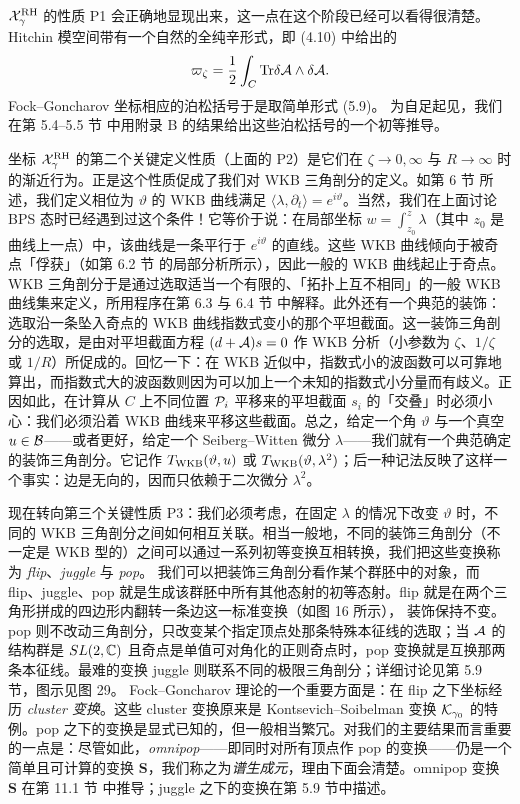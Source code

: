$\mathcal{X}^{\rm RH}_\gamma$ 的性质 P1 会正确地显现出来，这一点在这个阶段已经可以看得很清楚。Hitchin 模空间带有一个自然的全纯辛形式，即 (4.10) 中给出的%
\begin{equation}
\varpi_\zeta = \frac{1}{2}\int_{C} {\operatorname{Tr}} \delta \mathcal{A} \wedge \delta \mathcal{A}. \label{eq:symplectic}
\end{equation}
Fock–Goncharov 坐标相应的泊松括号于是取简单形式 (5.9)。%
为自足起见，我们在第 5.4–5.5 节%
中用附录 B%
的结果给出这些泊松括号的一个初等推导。

坐标 $\mathcal{X}^{\rm RH}_{\gamma}$ 的第二个关键定义性质（上面的 P2）是它们在 $\zeta \to 0,\infty$ 与 $R \to \infty$ 时的渐近行为。正是这个性质促成了我们对 WKB 三角剖分的定义。如第 6 节%
所述，我们定义相位为 $\vartheta$ 的 WKB 曲线满足 $\langle \lambda, \partial_t \rangle = e^{i \vartheta}$。当然，我们在上面讨论 BPS 态时已经遇到过这个条件！它等价于说：在局部坐标 $w = \int^z_{z_0} \lambda$（其中 $z_0$ 是曲线上一点）中，该曲线是一条平行于 $e^{i \vartheta}$ 的直线。这些 WKB 曲线倾向于被奇点「俘获」（如第 6.2 节%
的局部分析所示），因此一般的 WKB 曲线起止于奇点。WKB 三角剖分于是通过选取适当一个有限的、「拓扑上互不相同」的一般 WKB 曲线集来定义，所用程序在第 6.3 与 6.4 节%
中解释。此外还有一个典范的装饰：选取沿一条坠入奇点的 WKB 曲线指数式变小的那个平坦截面。这一装饰三角剖分的选取，是由对平坦截面方程 $(d+\mathcal{A})s=0$ 作 WKB 分析（小参数为 $\zeta$、$1/\zeta$ 或 $1/R$）所促成的。回忆一下：在 WKB 近似中，指数式小的波函数可以可靠地算出，而指数式大的波函数则因为可以加上一个未知的指数式小分量而有歧义。正因如此，在计算从 $C$ 上不同位置 $\mathcal{P}_i$ 平移来的平坦截面 $s_i$ 的「交叠」时必须小心：我们必须沿着 WKB 曲线来平移这些截面。总之，给定一个角 $\vartheta$ 与一个真空 $u\in \mathcal{B}$——或者更好，给定一个 Seiberg–Witten 微分 $\lambda$——我们就有一个典范确定的装饰三角剖分。它记作 $T_{\rm WKB}(\vartheta,u)$ 或 $T_{\rm WKB}(\vartheta, \lambda^2)$；后一种记法反映了这样一个事实：边是无向的，因而只依赖于二次微分 $\lambda^2$。

现在转向第三个关键性质 P3：我们必须考虑，在固定 $\lambda$ 的情况下改变 $\vartheta$ 时，不同的 WKB 三角剖分之间如何相互关联。相当一般地，不同的装饰三角剖分（不一定是 WKB 型的）之间可以通过一系列初等变换互相转换，我们把这些变换称为 \emph{flip}、\emph{juggle} 与 \emph{pop}。%
我们可以把装饰三角剖分看作某个群胚中的对象，而 flip、juggle、pop 就是生成该群胚中所有其他态射的初等态射。flip 就是在两个三角形拼成的四边形内翻转一条边这一标准变换（如图 16 所示），%
装饰保持不变。pop 则不改动三角剖分，只改变某个指定顶点处那条特殊本征线的选取；当 $\mathcal{A}$ 的结构群是 $SL(2,\mathbb{C})$ 且奇点是单值可对角化的正则奇点时，pop 变换就是互换那两条本征线。最难的变换 juggle 则联系不同的极限三角剖分；详细讨论见第 5.9 节，图示见图 29。%
Fock–Goncharov 理论的一个重要方面是：在 flip 之下坐标经历 \emph{cluster 变换}。这些 cluster 变换原来是 Kontsevich–Soibelman 变换 $\mathcal{K}_{\gamma_0}$ 的特例。pop 之下的变换是显式已知的，但一般相当繁冗。对我们的主要结果而言重要的一点是：尽管如此，\emph{omnipop}——即同时对所有顶点作 pop 的变换——仍是一个简单且可计算的变换 $\mathbf{S}$，我们称之为\emph{谱生成元}，理由下面会清楚。omnipop 变换 $\mathbf{S}$ 在第 11.1 节%
中推导；juggle 之下的变换在第 5.9 节中描述。

